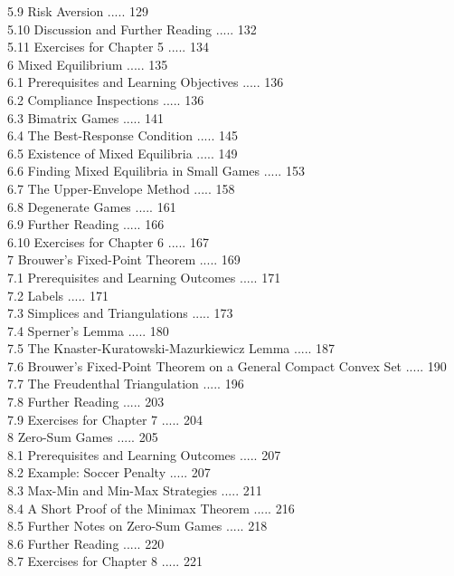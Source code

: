 \documentclass[12pt]{article}
\begin{document}
5.9 Risk Aversion ..... 129\\
5.10 Discussion and Further Reading ..... 132\\
5.11 Exercises for Chapter 5 ..... 134\\
6 Mixed Equilibrium ..... 135\\
6.1 Prerequisites and Learning Objectives ..... 136\\
6.2 Compliance Inspections ..... 136\\
6.3 Bimatrix Games ..... 141\\
6.4 The Best-Response Condition ..... 145\\
6.5 Existence of Mixed Equilibria ..... 149\\
6.6 Finding Mixed Equilibria in Small Games ..... 153\\
6.7 The Upper-Envelope Method ..... 158\\
6.8 Degenerate Games ..... 161\\
6.9 Further Reading ..... 166\\
6.10 Exercises for Chapter 6 ..... 167\\
7 Brouwer's Fixed-Point Theorem ..... 169\\
7.1 Prerequisites and Learning Outcomes ..... 171\\
7.2 Labels ..... 171\\
7.3 Simplices and Triangulations ..... 173\\
7.4 Sperner's Lemma ..... 180\\
7.5 The Knaster-Kuratowski-Mazurkiewicz Lemma ..... 187\\
7.6 Brouwer's Fixed-Point Theorem on a General Compact Convex Set ..... 190\\
7.7 The Freudenthal Triangulation ..... 196\\
7.8 Further Reading ..... 203\\
7.9 Exercises for Chapter 7 ..... 204\\
8 Zero-Sum Games ..... 205\\
8.1 Prerequisites and Learning Outcomes ..... 207\\
8.2 Example: Soccer Penalty ..... 207\\
8.3 Max-Min and Min-Max Strategies ..... 211\\
8.4 A Short Proof of the Minimax Theorem ..... 216\\
8.5 Further Notes on Zero-Sum Games ..... 218\\
8.6 Further Reading ..... 220\\
8.7 Exercises for Chapter 8 ..... 221\\
\end{document}
